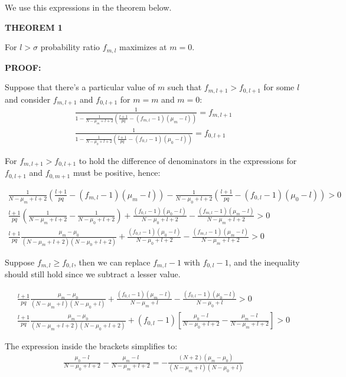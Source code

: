 \documentclass[11pt,draft]{article}
\begin{document}
We use this expressions in the theorem below.

\textbf{THEOREM 1}
 
For $l > \sigma$ probability ratio $f_{m,l}$ maximizes at $m=0$.

\textbf{PROOF:}

Suppose that there's a particular value of $m$ such that $f_{m,{l+1}}  > f_{0,{l+1}}$  for some $l$ and consider $f_{m,{l+1}}$ and $f_{0,{l+1}}$ for $m=m$ and $m=0$:
\begin{align}
\frac{  1 }{ 1  - \frac{1}{N- \mu_m + l + 2}\left (\frac{l+1}{pq} - (f_{m,l} - 1)(\mu_m-l) \right ) }  = f_{m,l+1} \\
\frac{  1 }{ 1  - \frac{1}{N- \mu_0 + l + 2}\left (\frac{l+1}{pq} - (f_{0,l} - 1)(\mu_0-l) \right ) }  = f_{0,l+1} 
\end{align}

For  $f_{m,{l+1}}  > f_{0,{l+1}}$  to hold the difference of denominators in the expressions for  $f_{0,l+1}$  and  $f_{0,m+1}$ must be positive, hence:

\begin{align}
\frac{1}{N-\mu_m + l+2} \left (\frac{l+1}{pq} - (f_{m,l} - 1)(\mu_m - l) \right ) -  \frac{1}{N-\mu_0 + l+2} \left (\frac{l+1}{pq} - (f_{0,l} - 1)(\mu_0 - l) \right) > 0\\
\frac{l+1}{pq} (\frac{1}{N-\mu_m + l + 2}  - \frac{1}{N-\mu_0 + l + 2} ) + \frac{(f_{0,l} - 1)(\mu_0 - l)}{N-\mu_0 + l+2} - \frac{(f_{m,l} - 1)(\mu_m - l)}{N-\mu_m + l+2} > 0 \\
 \frac{l+1}{pq} \frac{\mu_m - \mu_0}{(N-\mu_m + l+2)(N-\mu_0 + l+2)} + \frac{(f_{0,l} - 1)(\mu_0 - l)}{N-\mu_0 + l+2} - \frac{(f_{m,l} - 1)(\mu_m - l)}{N-\mu_m + l+2} > 0
\end{align}

Suppose $f_{m,l} \ge f_{0,l}$, then we can replace $f_{m,l} - 1$ with $f_{0,l} - 1$, and the inequality should still hold since we subtract a lesser value.

\begin{align}
\frac{l+1}{pq} \frac{\mu_m - \mu_0}{(N-\mu_m + l)(N-\mu_0 + l)}  + \frac{(f_{0,l} - 1)(\mu_m - l)}{N-\mu_m + l}  - \frac{(f_{0,l} - 1)(\mu_0 - l)}{N-\mu_0 + l} > 0\\
\frac{l+1}{pq} \frac{\mu_m - \mu_0}{(N-\mu_m + l+2)(N-\mu_0 + l+2)}  + (f_{0,l} - 1) \left [ \frac{\mu_0 - l}{N-\mu_0 + l+2}  - \frac{\mu_m - l}{N-\mu_m + l+2} \right ]  > 0
\end{align}

The expression inside the brackets simplifies to:
\begin{align}
\frac{\mu_0 - l}{N-\mu_0 + l+2}  - \frac{\mu_m - l}{N-\mu_m + l+2}  = - \frac{(N+2)(\mu_m-\mu_0)}{(N-\mu_m + l)(N-\mu_0 + l)}
\end{align}
\end{document}
